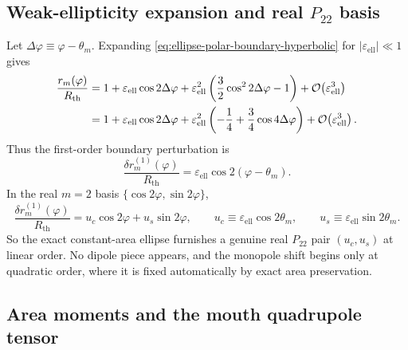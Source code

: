 \documentclass[11pt]{article}
\theoremstyle{plain}
\theoremstyle{definition}
\theoremstyle{remark}
\newcommand{\Ptwotwo}{P_{22}}
\newcommand{\Rth}{R_{\mathrm{th}}}
\newcommand{\epsell}{\varepsilon_{\mathrm{ell}}}
\newcommand{\thmouth}{\theta_m}
\newcommand{\Order}[1]{\mathcal{O}\!\left(#1\right)}
\begin{document}
\subsection{Weak-ellipticity expansion and real \texorpdfstring{$\Ptwotwo$}{P22} basis}\label{subsec:ellipse-small-eps}

Let \(\Delta\varphi\equiv \varphi-\thmouth\). Expanding \cref{eq:ellipse-polar-boundary-hyperbolic} for \(|\epsell|\ll 1\) gives
\begin{align}
\frac{r_m(\varphi)}{\Rth}
&=
1+\epsell\cos 2\Delta\varphi
+\epsell^2\left(\frac32\cos^2 2\Delta\varphi-1\right)
+\Order{\epsell^3}
\notag\\
&=
1+\epsell\cos 2\Delta\varphi
+\epsell^2\left(-\frac14+\frac34\cos 4\Delta\varphi\right)
+\Order{\epsell^3}.
\label{eq:ellipse-small-eps-expansion}
\end{align}
Thus the first-order boundary perturbation is
\begin{equation}
\frac{\delta r_m^{(1)}(\varphi)}{\Rth}
=
\epsell\cos 2(\varphi-\thmouth).
\label{eq:ellipse-first-order-boundary}
\end{equation}
In the real \(m=2\) basis \(\{\cos 2\varphi,\sin 2\varphi\}\),
\begin{equation}
\frac{\delta r_m^{(1)}(\varphi)}{\Rth}
=u_c\cos 2\varphi+u_s\sin 2\varphi,
\qquad
u_c\equiv \epsell\cos 2\thmouth,
\qquad
u_s\equiv \epsell\sin 2\thmouth.
\label{eq:ellipse-real-p22-basis}
\end{equation}
So the exact constant-area ellipse furnishes a genuine real \(\Ptwotwo\) pair \((u_c,u_s)\) at linear order. No dipole piece appears, and the monopole shift begins only at quadratic order, where it is fixed automatically by exact area preservation.

\subsection{Area moments and the mouth quadrupole tensor}\label{subsec:ellipse-quadrupole}
\end{document}
